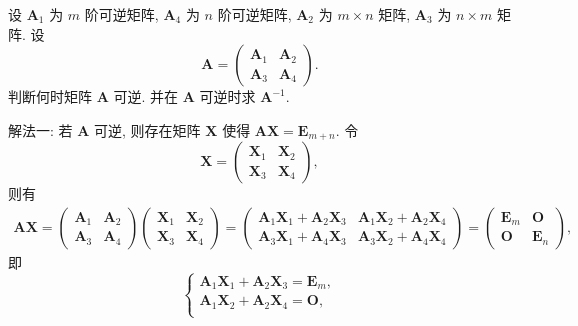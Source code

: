 \documentclass[../../main.tex]{subfiles}%
\begin{document}
\begin{example}
设 \(\boldsymbol{A}_1\) 为 \(m\) 阶可逆矩阵, \(\boldsymbol{A}_4\) 为 \(n\) 阶可逆矩阵, \(\boldsymbol{A}_2\) 为 \(m \times n\) 矩阵, \(\boldsymbol{A}_3\) 为 \(n \times m\) 矩阵. 设
\[
\boldsymbol{A} = \begin{pmatrix} \boldsymbol{A}_1 & \boldsymbol{A}_2 \\ \boldsymbol{A}_3 & \boldsymbol{A}_4 \end{pmatrix}.
\]
判断何时矩阵 \(\boldsymbol{A}\) 可逆. 并在 \(\boldsymbol{A}\) 可逆时求 \(\boldsymbol{A}^{-1}\).
\end{example}
\begin{solution}

{\color{blue}解法一:}
若 \(\boldsymbol{A}\) 可逆, 则存在矩阵 \(\boldsymbol{X}\) 使得 \(\boldsymbol{A}\boldsymbol{X} = \boldsymbol{E}_{m + n}\). 令
\[
\boldsymbol{X} = \begin{pmatrix} \boldsymbol{X}_1 & \boldsymbol{X}_2 \\ \boldsymbol{X}_3 & \boldsymbol{X}_4 \end{pmatrix},
\]
则有
\[
\begin{aligned}
\boldsymbol{A}\boldsymbol{X} = \begin{pmatrix} \boldsymbol{A}_1 & \boldsymbol{A}_2 \\ \boldsymbol{A}_3 & \boldsymbol{A}_4 \end{pmatrix} \begin{pmatrix} \boldsymbol{X}_1 & \boldsymbol{X}_2 \\ \boldsymbol{X}_3 & \boldsymbol{X}_4 \end{pmatrix} = \begin{pmatrix} \boldsymbol{A}_1\boldsymbol{X}_1 + \boldsymbol{A}_2\boldsymbol{X}_3 & \boldsymbol{A}_1\boldsymbol{X}_2 + \boldsymbol{A}_2\boldsymbol{X}_4 \\ \boldsymbol{A}_3\boldsymbol{X}_1 + \boldsymbol{A}_4\boldsymbol{X}_3 & \boldsymbol{A}_3\boldsymbol{X}_2 + \boldsymbol{A}_4\boldsymbol{X}_4 \end{pmatrix} = \begin{pmatrix} \boldsymbol{E}_m & \boldsymbol{O} \\ \boldsymbol{O} & \boldsymbol{E}_n \end{pmatrix},
\end{aligned}
\]
即
\[
\begin{cases}
\boldsymbol{A}_1\boldsymbol{X}_1 + \boldsymbol{A}_2\boldsymbol{X}_3 = \boldsymbol{E}_m, \\
\boldsymbol{A}_1\boldsymbol{X}_2 + \boldsymbol{A}_2\boldsymbol{X}_4 = \boldsymbol{O}, \\

\end{cases}\]
\end{solution}
\end{document}
